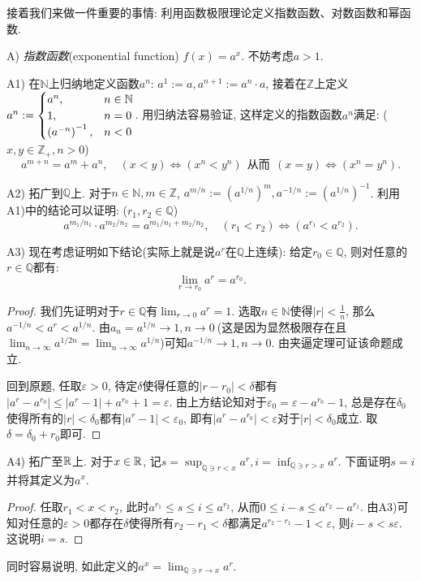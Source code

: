 接着我们来做一件重要的事情: 利用函数极限理论定义指数函数、对数函数和幂函数. 

A) \textit{指数函数}(exponential function) $f(x)=a^x$. 不妨考虑$a>1$. 

A1) 在$\mathbb{N}$上归纳地定义函数$a^n$: $a^1:=a, a^{n+1}:=a^n \cdot a$, 接着在$\mathbb{Z}$上定义$a^n:=\begin{cases}
	a^n, &n\in \mathbb{N} \\ 1, &n=0 \\ \left( a^{-n} \right)^{-1}, &n<0
\end{cases}$. 用归纳法容易验证, 这样定义的指数函数$a^n$满足: ($x,y \in \mathbb{Z}_+,n>0$)$$a^{m+n}=a^m+a^n,\quad (x<y) \Leftrightarrow (x^n<y^n)  ~~\textit{从而} ~~ (x=y) \Leftrightarrow (x^n=y^n).$$

A2) 拓广到$\mathbb{Q}$上. 对于$n\in \mathbb{N},m\in \mathbb{Z}$, $a^{m/n}:= (a^{1/n})^m, a^{-1/n}:=(a^{1/n})^{-1}$. 利用A1)中的结论可以证明: ($r_1,r_2 \in \mathbb{Q}$) $$a^{m_1/n_1} \cdot a^{m_2/n_2} = a^{m_1/n_1+m_2/n_2},\quad (r_1<r_2) \Leftrightarrow (a^{r_1} < a^{r_2}).$$

A3) 现在考虑证明如下结论(实际上就是说$a^r$在$\mathbb{Q}$上连续): 给定$r_0 \in \mathbb{Q}$, 则对任意的$r \in \mathbb{Q}$都有: $$\lim_{r \to r_0} a^r = a^{r_0}.$$
\begin{proof}
	我们先证明对于$r \in \mathbb{Q}$有$\lim_{r\to 0} a^r = 1$. 选取$n \in \mathbb{N}$使得$|r|<\frac{1}{n}$, 那么$a^{-1/n} < a^r < a^{1/n}$. 由$a_n = a^{1/n} \to 1, n\to 0~$(这是因为显然极限存在且$\lim_{n\to \infty} a^{1/2n} = \lim_{n\to \infty} a^{1/n}$)可知$a^{-1/n} \to 1, n\to 0$. 由夹逼定理可证该命题成立. 
	
	回到原题, 任取$\varepsilon >0$, 待定$\delta$使得任意的$|r-r_0|<\delta$都有$|a^r-a^{r_0}|\leq |a^r-1|+a^{r_0}+1=\varepsilon$. 由上方结论知对于$\varepsilon _0 = \varepsilon - a^{r_0} -1$, 总是存在$\delta _0$使得所有的$|r|<\delta _0$都有$|a^r-1|<\varepsilon _0$, 即有$|a^r-a^{r_0}|<\varepsilon$对于$|r|<\delta _0$成立. 取$\delta = \delta _0+r_0$即可. 
\end{proof}

A4) 拓广至$\mathbb{R}$上. 对于$x \in \mathbb{R}$, 记$\displaystyle  s=\sup_{\mathbb{Q} \ni r < x} a^r, i=\inf_{\mathbb{Q} \ni r > x} a^r$. 下面证明$s=i$并将其定义为$a^x$. 

\begin{proof}
	任取$r_1<x<r_2$, 此时$a^{r_1} \leq s \leq i \leq a^{r_2}$, 从而$0\leq i-s \leq a^{r_2}-a^{r_1}$. 由A3)可知对任意的$\varepsilon >0$都存在$\delta$使得所有$r_2-r_1<\delta$都满足$a^{r_2-r_1} - 1<\varepsilon$, 则$i-s < s\varepsilon$. 这说明$i=s$. 
\end{proof}
同时容易说明, 如此定义的$a^x = \lim_{\mathbb{Q} \ni r \to x} a^r$. 

